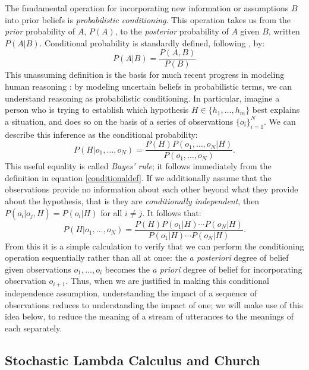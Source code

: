 \documentclass[pdfextras]{handbook}
\begin{document}

The fundamental operation for incorporating new information or assumptions $B$ into prior beliefs is \emph{probabilistic conditioning}. 
This operation takes us from the \emph{prior} probability of $A$, $P(A)$, to the \emph{posterior} probability of $A$ given $B$, written $P(A|B)$. 
Conditional probability is standardly defined, following \citet{kolmogorov33}, by:
\begin{equation}
\label{conditionaldef}
P(A|B) = \frac{P(A,B)}{P(B)} 
\end{equation}
This unassuming definition is the basis for much recent progress in modeling human reasoning \cite[e.g.][]{griffithsetal08,tenenbaumetal11}: by modeling uncertain beliefs in probabilistic terms, we can understand reasoning as probabilistic conditioning. 
In particular, imagine a person who is trying to establish which hypothesis $H\in\{h_1,\dots,h_m\}$ best explains a situation, and does so on the basis of a series of observations $\{o_i\}_{i=1}^N$. 
We can describe this inference as the conditional probability:
\begin{equation}
P(H|o_1,\dots,o_N) = \frac{P(H)P(o_1,\dots,o_N|H)}{P(o_1,\dots,o_N)}.
\end{equation}
This useful equality is called \emph{Bayes' rule}; it follows immediately from the definition in equation \ref{conditionaldef}. 
If we additionally assume that the observations provide no information about each other beyond what they provide about the hypothesis, that is they are \emph{conditionally independent}, then $P(o_i|o_j, H)=P(o_i|H)$ for all $i\neq j$. 
It follows that:
\begin{equation}
P(H|o_1,\dots,o_N) = \frac{P(H)P(o_1|H)\cdots P(o_N|H)}{P(o_1|H)\cdots P(o_N|H)}.
\end{equation}
From this it is a simple calculation to verify that we can perform the conditioning operation sequentially rather than all at once: the \emph{a posteriori} degree of belief given observations $o_1,\dots,o_i$ becomes the \emph{a priori} degree of belief for incorporating observation $o_{i+1}$. Thus, when we are justified in making this conditional independence assumption, understanding the impact of a sequence of observations reduces to understanding the impact of one; we will make use of this idea below, to reduce the meaning of a stream of utterances to the meanings of each separately.


\subsection{Stochastic Lambda Calculus and Church}
\end{document}
